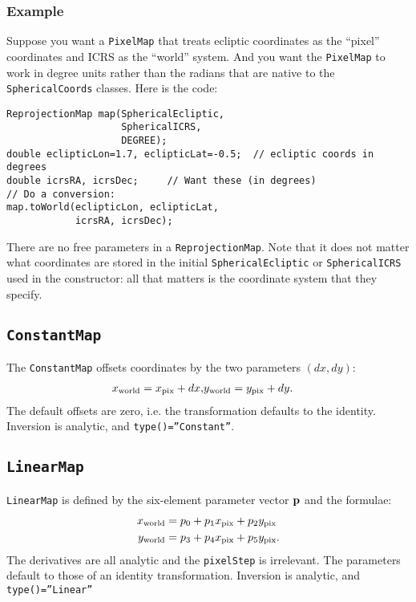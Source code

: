 \documentclass[11pt,preprint,flushrt]{aastex}
\begin{document}
\subsubsection{Example}
Suppose you want a {\tt PixelMap} that treats ecliptic coordinates as the ``pixel'' coordinates and ICRS as the ``world'' system.  And you want the {\tt PixelMap} to work in degree units rather than the radians that are native to the {\tt SphericalCoords} classes.  Here is the code:
\begin{verbatim}
ReprojectionMap map(SphericalEcliptic,
                    SphericalICRS,
                    DEGREE);
double eclipticLon=1.7, eclipticLat=-0.5;  // ecliptic coords in degrees
double icrsRA, icrsDec;     // Want these (in degrees)
// Do a conversion:
map.toWorld(eclipticLon, eclipticLat,
            icrsRA, icrsDec);
\end{verbatim}
There are no free parameters in a {\tt ReprojectionMap}.  Note that it does not matter what coordinates are stored in the initial {\tt SphericalEcliptic} or {\tt SphericalICRS} used in the constructor: all that matters is the coordinate system that they specify.

\subsection{{\tt ConstantMap}}
The \texttt{ConstantMap} offsets coordinates by the two parameters $(dx,dy)$:
\begin{align}
x_{\rm world} = x_{\rm pix} + dx, &
y_{\rm world} = y_{\rm pix} + dy.
\end{align}
The default offsets are zero, i.e. the transformation defaults to the identity. Inversion is analytic, and \texttt{type()=''Constant''}.

\subsection{{\tt LinearMap}}
{\tt LinearMap} is defined by the six-element parameter vector ${\bf p}$ and the formulae:
\begin{align}
x_{\rm world} & =  p_0 + p_1 x_{\rm pix} + p_2 y_{\rm pix} \\
y_{\rm world} & =  p_3 + p_4 x_{\rm pix} + p_5 y_{\rm pix}.
\end{align}
The derivatives are all analytic and the {\tt pixelStep} is irrelevant.  The parameters default to those of an identity transformation. Inversion is analytic, and \texttt{type()=''Linear''}
\end{document}
